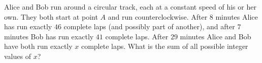 Alice and Bob run around a circular track, each at a constant speed of his or her own. They both start at point $A$ and run counterclockwise. After $8$ minutes Alice has run exactly $46$ complete laps (and possibly part of another), and after $7$ minutes Bob has run exactly $41$ complete laps. After $29$ minutes Alice and Bob have both run exactly $x$ complete laps. What is the sum of all possible integer values of $x$?
